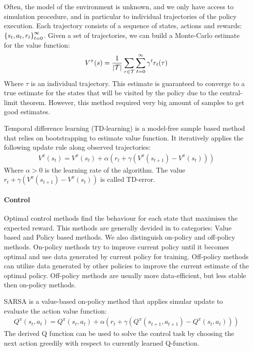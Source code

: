 Often, the model of the environment is unknown, and we only have access to simulation procedure, and in particular to
individual trajectories of the policy execution. Each trajectory consists of a sequence of states, actions and rewards:
$\left\{ s_t, a_t, r_t \right\}_{t = 0}^{\infty}$. Given a set of trajectories, we can build a Monte-Carlo estimate for the value function:
\begin{align*}
    V^{\pi}(s) = \frac{1}{\left | \mathcal{T} \right |} \sum_{\tau \in \mathcal{T}} \sum_{t = 0}^{\infty} \gamma^t r_t(\tau)
\end{align*}
Where $\tau$ is an individual trajectory. This estimate is guaranteed to converge to a true
estimate for the states that will be visited by the policy due to the central-limit theorem.
However, this method required very big amount of samples to get good estimates.

Temporal difference learning (TD-learning) is a model-free sample based method that relies on bootstrapping to
estimate value function. It iteratively applies the following update rule along observed
trajectories:
\begin{align*}
    V^{\pi}(s_t) = V^{\pi}(s_t) + \alpha (r_t + \gamma (V^{\pi}(s_{t + 1}) - V^{\pi}(s_t)))
\end{align*}
Where $\alpha > 0$ is the learning rate of the algorithm. The value $r_t + \gamma (V^{\pi}(s_{t +
1}) - V^{\pi}(s_t))$ is called TD-error.

\paragraph{Control}
Optimal control methods find the behaviour for each state that maximises the expected reward. This
methods are generally devided in to categories: Value based and Policy based methods.
We also distinguish on-policy and off-policy methods. On-policy methods try to improve current
policy until it becomes optimal and use data generated by current policy for training.
Off-policy methods can utilize data generated by other policies to improve the current estimate of
the optimal policy. Off-policy methods are usually more data-efficient, but less stable then on-policy
methods.

SARSA is a value-based on-policy method that applies simular update to evaluate the action value function:
\begin{align*}
    Q^{\pi}(s_t, a_t) = Q^{\pi}(s_t, a_t) + \alpha (r_t + \gamma (Q^{\pi}(s_{t + 1}, a_{t + 1}) -
    Q^{\pi}(s_t, a_t)))
\end{align*}
The derived Q function can be used to solve the control task by choosing the next action greedily
with respect to currently learned Q-function.


